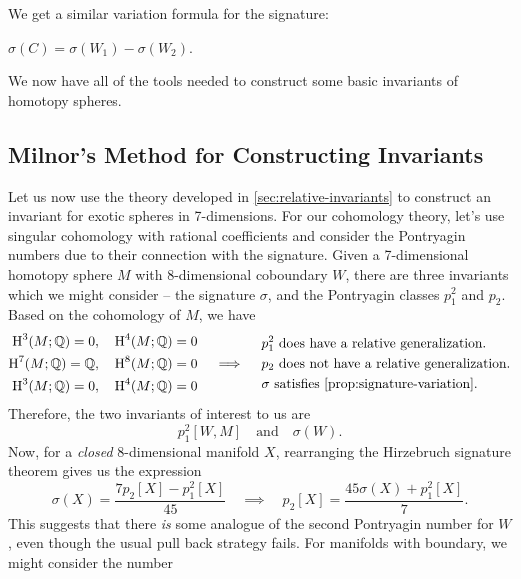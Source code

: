 We get a similar variation formula for the signature:

\begin{proposition}\label{prop:signature-variation}
	$\sigma(C)=\sigma(W_1)-\sigma(W_2)$.
\end{proposition}

We now have all of the tools needed to construct some basic invariants of homotopy spheres.

\subsection{Milnor's Method for Constructing Invariants}\label{sec:milnor-method}

Let us now use the theory developed in \cref{sec:relative-invariants} to construct an invariant for exotic spheres in 7-dimensions. For our cohomology theory, let's use singular cohomology with rational coefficients and consider the Pontryagin numbers due to their connection with the signature.
Given a 7-dimensional homotopy sphere $M$ with 8-dimensional coboundary $W$, there are three invariants which we might consider -- the signature $\sigma$, and the Pontryagin classes $p_1^2$ and $p_2$.
Based on the cohomology of $M$, we have
\[
	\begin{aligned}
		\H^3(M; \Q)=0,  & \quad \H^4(M; \Q)=0 \\
		\H^7(M; \Q)=\Q, & \quad \H^8(M; \Q)=0 \\
		\H^3(M; \Q)=0,  & \quad \H^4(M; \Q)=0
	\end{aligned}
	\quad\implies\quad
	\begin{aligned}
		 & p_1^2\textrm{ does have a relative generalization.}        \\
		 & p_2\textrm{ does not have a relative generalization.}      \\
		 & \sigma\textrm{ satisfies \cref{prop:signature-variation}.}
	\end{aligned}
\]
Therefore, the two invariants of interest to us are
\[
	p_1^2[W,M]
	\quad\textrm{and}\quad
	\sigma(W).
\]
Now, for a \emph{closed} $8$-dimensional manifold $X$, rearranging the Hirzebruch signature theorem gives us the expression
\begin{equation}\label{eq:7-manifold_rearrangement}
	\sigma(X) = \frac{7p_2[X] - p_1^2[X]}{45}
	\quad\implies\quad
	p_2[X] = \frac{45\sigma(X) + p_1^2[X]}{7}.
\end{equation}
This suggests that there \emph{is} some analogue of the second Pontryagin number for $W$, even though the usual pull back strategy fails. For manifolds with boundary, we might consider the number
